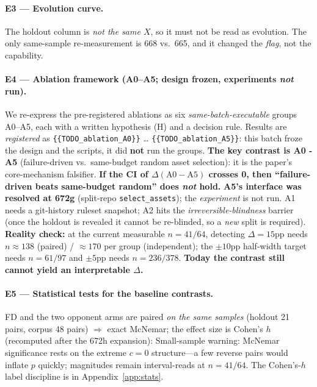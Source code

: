 \documentclass{article}
\begin{document}
\paragraph{E3 --- Evolution curve.}
The holdout column is \emph{not the same $X$}, so it must not be read as evolution. The only
same-sample re-measurement is 668 vs.\ 665, and it changed the \emph{flag}, not the capability.

\paragraph{E4 --- Ablation framework (A0--A5; design frozen, experiments \emph{not} run).}
We re-express the pre-registered ablations as six \emph{same-batch-executable} groups A0--A5, each
with a written hypothesis (H) and a decision rule. Results are \emph{registered} as
\texttt{\{\{TODO\_ablation\_A0\}\}} \dots{} \texttt{\{\{TODO\_ablation\_A5\}\}}: this batch froze the
design and the scripts, it did \textbf{not} run the groups.
\textbf{The key contrast is A0 - A5} (failure-driven vs.\ same-budget random asset selection): it is
the paper's core-mechanism falsifier. \textbf{If the CI of $\Delta(\text{A0} - \text{A5})$ crosses
0, then ``failure-driven beats same-budget random'' does \emph{not} hold.} \textbf{A5's interface
was resolved at 672g} (split-repo \texttt{select\_assets}); the \emph{experiment} is not run. A1
needs a git-history ruleset snapshot; A2
hits the \emph{irreversible-blindness} barrier (once the holdout is revealed it cannot be re-blinded,
so a \emph{new} split is required). \textbf{Reality check:} at the current measurable $n=41/64$,
detecting $\Delta=15$pp needs $n\approx138$ (paired) / $\approx170$ per group (independent); the
$\pm10$pp half-width target needs $n=61/97$ and $\pm5$pp needs $n=236/378$. \textbf{Today the contrast still cannot yield an
interpretable $\Delta$.}

\paragraph{E5 --- Statistical tests for the baseline contrasts.}
FD and the two opponent arms are paired \emph{on the same samples} (holdout 21 pairs, corpus 48
pairs) $\Rightarrow$ exact McNemar; the effect size is Cohen's $h$~\cite{cohen1988statistical}
(recomputed after the 672h expansion):
Small-sample warning: McNemar significance rests on the extreme $c{=}0$ structure---a few reverse
pairs would inflate $p$ quickly; magnitudes remain interval-reads at $n=41/64$. The Cohen's-$h$
label discipline is in Appendix~\ref{app:stats}.
\end{document}
